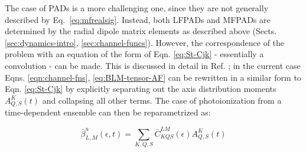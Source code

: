 
The case of PADs is a more challenging one, since they are not generally described by Eq.~\ref{eq:mfrealsig}. Instead, both LFPADs and MFPADs are determined by the radial dipole matrix elements as described above (Sects. \ref{sec:dynamics-intro}, \ref{sec:channel-funcs}). However, the correspondence of the problem with an equation of the form of Eqn. \ref{eq:St-Cjk} - essentially a convolution - can be made. This is discussed in detail in Ref. \cite{Underwood2000}; in the current case Eqns. \ref{eqn:channel-fns}, \ref{eq:BLM-tensor-AF} can be rewritten in a similar form to Eqn. \ref{eq:St-Cjk} by explicitly separating out the axis distribution moments $A_{Q,S}^{K}(t)$ and collapsing all other terms. The case of photoionization from a time-dependent ensemble can then be reparametrized as:




\begin{equation}
\bar{\beta}_{L,M}^{u}(\epsilon,t)=\sum_{K,Q,S}\bar{C}_{KQS}^{LM}(\epsilon)A_{Q,S}^{K}(t)
\label{eqn:beta-convolution-C}
\end{equation}

